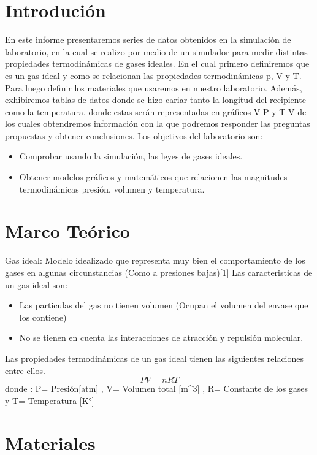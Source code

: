 \documentclass[]{article}
\begin{document}
\section{Introdución}
En este informe presentaremos series de datos obtenidos en la simulación de laboratorio, en la cual se realizo por medio de un simulador para medir distintas propiedades termodinámicas de gases ideales.
En el cual primero definiremos que es un gas ideal y como se relacionan las propiedades termodinámicas p, V y T. Para luego definir los materiales que usaremos en nuestro laboratorio.
Además, exhibiremos tablas de datos donde se hizo cariar tanto la longitud del recipiente como la temperatura, donde estas serán representadas en gráficos V-P y T-V de los cuales obtendremos información con la que podremos responder las preguntas propuestas y obtener conclusiones.
Los objetivos del laboratorio son:
 \begin{itemize}  %
      \item Comprobar usando la simulación, las leyes de gases ideales.
      \item Obtener modelos gráficos y matemáticos que relacionen las magnitudes termodinámicas presión,
      volumen y temperatura.
\end{itemize}


\section{Marco Teórico}
Gas ideal: Modelo idealizado que representa muy bien el comportamiento 
de los gases en algunas circunstancias (Como a presiones bajas)[1]
Las caracteristicas de un gas ideal son:
\begin{itemize}
      \item Las particulas del gas no tienen volumen (Ocupan el volumen del envase que los contiene)
      \item No se tienen en cuenta las interacciones de atracción y repulsión molecular.
\end{itemize}
Las propiedades termodinámicas de un gas ideal tienen las siguientes relaciones entre ellos.
\begin{equation*}
      PV=nRT
\end{equation*}
donde :
P= Presión[atm]   , V= Volumen total [m^3] , R= Constante de los gases  y  T= Temperatura [K°]

\section{Materiales}
\end{document}
